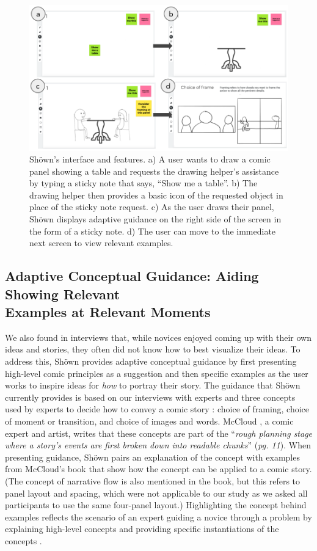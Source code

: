 \begin{figure}[t!]
  \includegraphics[width=\textwidth]{shown/figures/shown.png}
  \caption[Sh{\"o}wn’s interface and features.]{Sh{\"o}wn’s interface and features. a) A user wants to draw a comic panel showing a table and requests the drawing helper's assistance by typing a sticky note that says, ``Show me a table''. b) The drawing helper then provides a basic icon of the requested object in place of the sticky note request. c) As the user draws their panel, Sh{\"o}wn displays adaptive guidance on the right side of the screen in the form of a sticky note. d) The user can move to the immediate next screen to view relevant examples.}
  \label{fig:shown}
\end{figure}

\subsection{Adaptive Conceptual Guidance: Aiding Showing Relevant \\Examples at Relevant Moments}
We also found in interviews that, while novices enjoyed coming up with their own ideas and stories, they often did not know how to best visualize their ideas. To address this, Sh{\"o}wn provides adaptive conceptual guidance by first presenting high-level comic principles as a suggestion and then specific examples as the user works to inspire ideas for \emph{how} to portray their story. 
The guidance that Sh{\"o}wn currently provides is based on our interviews with experts and three concepts used by experts to decide how to convey a comic story \cite{abel2008drawing,eisner2008comics,mccloud2006making}: choice of framing, choice of moment or transition, and choice of images and words. McCloud \cite{mccloud2006making}, a comic expert and artist, writes that these concepts are part of the ``\textit{rough planning stage where a story’s events are first broken down into readable chunks}'' (\textit{pg. 11}). When presenting guidance, Sh{\"o}wn pairs an explanation of the concept with examples from McCloud’s book that show how the concept can be applied to a comic story.
(The concept of narrative flow is also mentioned in the book, but this refers to panel layout and spacing, which were not applicable to our study as we asked all participants to use the same four-panel layout.) Highlighting the concept behind examples reflects the scenario of an expert guiding a novice through a problem by explaining high-level concepts and providing specific instantiations of the concepts \cite{schon1984reflective}.

